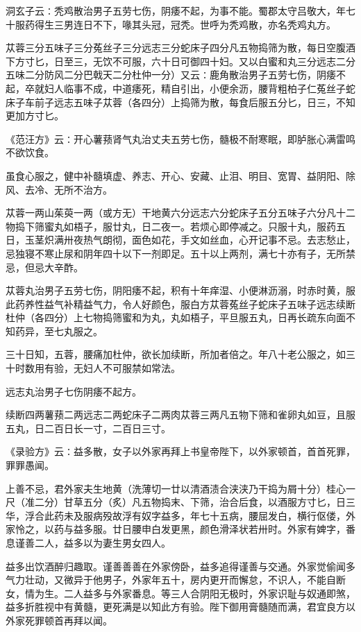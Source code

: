 \documentclass[a4paper,12pt,UTF8,twoside]{ctexbook}
\begin{document}
洞玄子云∶秃鸡散治男子五劳七伤，阴痿不起，为事不能。蜀郡太守吕敬大，年七十服药得生三男连日不下，喙其头冠，冠秃。世呼为秃鸡散，亦名秃鸡丸方。

苁蓉三分五味子三分菟丝子三分远志三分蛇床子四分凡五物捣筛为散，每日空腹酒下方寸匕，日至三，无饮不可服，六十日可御四十妇。又以白蜜和丸三分远志二分五味二分防风二分巴戟天二分杜仲一分）又云∶鹿角散治男子五劳七伤，阴痿不起，卒就妇人临事不成，中道痿死，精自引出，小便余沥，腰背粗柏子仁菟丝子蛇床子车前子远志五味子苁蓉（各四分）上捣筛为散，每食后服五分匕，日三，不知更加方寸匕。

《范汪方》云∶开心薯蓣肾气丸治丈夫五劳七伤，髓极不耐寒眠，即胪胀心满雷鸣不欲饮食。

虽食心服之，健中补髓填虚、养志、开心、安藏、止泪、明目、宽胃、益阴阳、除风、去冷、无所不治方。

苁蓉一两山茱萸一两（或方无）干地黄六分远志六分蛇床子五分五味子六分凡十二物捣下筛蜜丸如梧子，服廿丸，日二夜一。若烦心即停减之。只服十丸，服药五日，玉茎炽满卅夜热气朗彻，面色如花，手文如丝血，心开记事不忌。去志愁止，忌独寝不寒止尿和阴年四十以下一剂即足。五十以上两剂，满七十亦有子，无所禁忌，但忌大辛酢。

苁蓉丸治男子五劳七伤，阴阳痿不起，积有十年痒湿、小便淋沥溺，时赤时黄，服此药养性益气补精益气力，令人好颜色，服白方苁蓉菟丝子蛇床子五味子远志续断杜仲（各四分）上七物捣筛蜜和为丸，丸如梧子，平旦服五丸，日再长疏东向面不知药异，至七丸服之。

三十日知，五蓉，腰痛加杜仲，欲长加续断，所加者倍之。年八十老公服之，如三十时数用有验，无妇人不可服禁如常法。

远志丸治男子七伤阴痿不起方。

续断四两薯蓣二两远志二两蛇床子二两肉苁蓉三两凡五物下筛和雀卵丸如豆，且服五丸，日二百日长一寸，二百日三寸。

《录验方》云∶益多散，女子以外家再拜上书皇帝陛下，以外家顿首，首首死罪，罪罪愚闻。

上善不忌，君外家夫生地黄（洗薄切一廿以清酒渍合浃浃乃干捣为屑十分）桂心一尺（准二分）甘草五分（炙）凡五物捣末、下筛，治合后食，以酒服方寸匕，日三华，浮合此药未及服病殁故浮有奴字益多，年七十五病，腰屈发白，横行伛偻，外家怜之，以药与益多服。廿日腰申白发更黑，颜色滑泽状若卅时。外家有婢字，番息谨善二人，益多以为妻生男女四人。

益多出饮酒醉归趣取。谨善善善在外家傍卧，益多追得谨善与交通。外家觉偷闻多气力壮动，又微异于他男子，外家年五十，房内更开而懈怠，不识人，不能自断女，情为生。二人益多与外家番息。等三人合阴阳无极时，外家识耻与奴通即煞，益多折胜视中有黄髓，更死满是以知此方有验。陛下御用膏髓随而满，君宜良方以外家死罪顿首再拜以闻。
\end{document}
